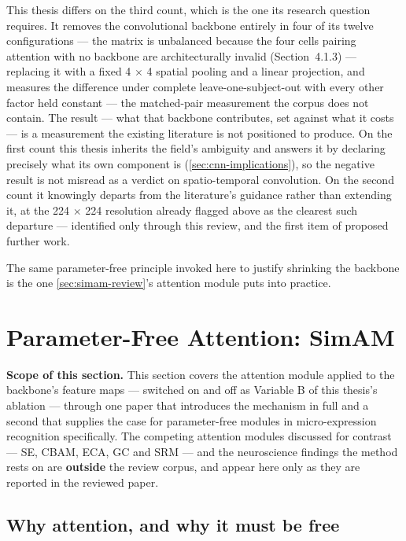 This thesis differs on the third count, which is the one its research question requires. It removes the convolutional backbone entirely in four of its twelve configurations --- the matrix is unbalanced because the four cells pairing attention with no backbone are architecturally invalid (Section~4.1.3) --- replacing it with a fixed 4 $\times$ 4 spatial pooling and a linear projection, and measures the difference under complete leave-one-subject-out with every other factor held constant --- the matched-pair measurement the corpus does not contain. The result --- what that backbone contributes, set against what it costs --- is a measurement the existing literature is not positioned to produce. On the first count this thesis inherits the field's ambiguity and answers it by declaring precisely what its own component is (\autoref{sec:cnn-implications}), so the negative result is not misread as a verdict on spatio-temporal convolution. On the second count it knowingly departs from the literature's guidance rather than extending it, at the 224 $\times$ 224 resolution already flagged above as the clearest such departure --- identified only through this review, and the first item of proposed further work.

The same parameter-free principle invoked here to justify shrinking the backbone is the one \autoref{sec:simam-review}'s attention module puts into practice.


\section{Parameter-Free Attention: SimAM}
\label{sec:simam-review}

\textbf{Scope of this section.} This section covers the attention module applied to the backbone's feature maps --- switched on and off as Variable B of this thesis's ablation --- through one paper that introduces the mechanism in full and a second that supplies the case for parameter-free modules in micro-expression recognition specifically. The competing attention modules discussed for contrast --- SE, CBAM, ECA, GC and SRM --- and the neuroscience findings the method rests on are \textbf{outside} the review corpus, and appear here only as they are reported in the reviewed paper.

\subsection{Why attention, and why it must be free}
\label{sec:simam-why}

